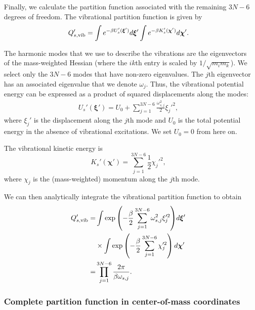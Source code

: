 \documentclass[pre, aps, twocolumn, reprint, amsmath,amssymb, showpacs,
superscriptaddress] {revtex4-1}
\begin{document}
Finally, we calculate the partition function associated with the
remaining $3N-6$ degrees of freedom. The vibrational partition function
is given by
\begin{equation*}
Q_{s,\textnormal{vib}}' = \int e^{-\beta U'_s(\bm{\xi}')} d\bm{\xi}' 
\int e^{-\beta K'_s(\bm{\chi}')} d\bm{\chi}'.
\end{equation*}


The harmonic modes that we use to describe the vibrations are the
eigenvectors of the mass-weighted Hessian (where the $ik$th entry is
scaled by $1/\sqrt{m_i m_k}$). We select only the $3N-6$ modes that have
non-zero eigenvalues. The $j$th eigenvector has an associated eigenvalue
that we denote $\omega_j$. Thus, the vibrational potential energy can be
expressed as a product of squared displacements along the modes:
\begin{equation*}
	\begin{split}
    	U_{s}'(\bm{\xi}') = U_0 + \sum_{j=1}^{3N-6}{\frac{\omega^2_{s,j}}{2} \xi_j'^2},
    \end{split}
\end{equation*}
where $\xi_j'$ is the displacement along the $j$th mode and $U_0$ is the
total potential energy in the absence of vibrational excitations. We set
$U_0=0$ from here on.

The vibrational kinetic energy is
\begin{equation*}
  K_{s}'(\bm{\chi}') = \sum_{j=1}^{3N-6}\frac{1}{2}\chi_j'^2,
\end{equation*}
where $\chi_j$ is the (mass-weighted) momentum along the $j$th mode.

We can then analytically integrate the vibrational partition function to
obtain
\begin{equation*}
	\begin{split}
		Q_{s, \textnormal{vib}}'  = &\int{ \exp{\left(-\frac{\beta}{2} 
        \sum_{j=1}^{3N-6} {\omega^2_{s,j} \xi_j'^2} \right) }}d\bm{\xi}' \\
         &\times\int \exp \left( -\frac{\beta}{2} \sum_{j=1}^{3N-6} \chi_j'^2 \right) d\bm{\chi}' \\
        =  &\prod_{j=1}^{3N-6} \frac{2\pi}{\beta \omega_{s,j}}.
    \end{split}
\end{equation*}

\subsubsection{Complete partition function in center-of-mass coordinates}
\end{document}
